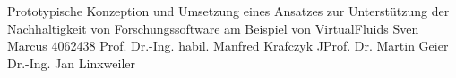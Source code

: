 \iRMBMaster
{Prototypische Konzeption und Umsetzung eines Ansatzes zur Unterstützung der Nachhaltigkeit von Forschungssoftware am Beispiel von VirtualFluids}            
{Sven Marcus}
{4062438}
{Prof. Dr.-Ing. habil. Manfred Krafczyk}
{JProf. Dr. Martin Geier}
{Dr.-Ing. Jan Linxweiler}
